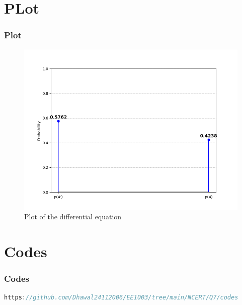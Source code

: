 \documentclass{beamer}
\theoremstyle{remark}
\numberwithin{equation}{section}
\begin{document}
\section{PLot}
\begin{frame}[fragile]
\frametitle{Plot}

\begin{figure}[h]
    \centering
    \includegraphics[width=0.9\columnwidth]{figs/Figure_1.png}
    \caption{Plot of the differential equation }
    \label{fig:Plot}
    \end{figure}
\end{frame}

\section{Codes}
\begin{frame}[fragile]
\frametitle{Codes}
\begin{lstlisting}[language=C]
https://github.com/Dhawal24112006/EE1003/tree/main/NCERT/Q7/codes
    \end{lstlisting}
\end{frame}
\end{document}
